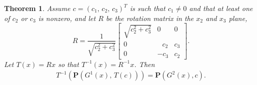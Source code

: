 \documentclass{article}
\newtheorem{theorem}{Theorem}
\def\bP{\mathbf{P}}
\begin{document}
\begin{theorem} \label{thm-cylinder}
Assume $c = (c_1, \, c_2, \, c_3)^T$ is such that $c_1 \neq 0$
and that at least one of $c_2$ or $c_3$ is nonzero, and let $R$ be 
the rotation matrix in the $x_2$ and $x_3$ plane,
\[
R = \frac{1}{\sqrt{c_2^2 + c_3^2}}
    \left[ \begin{array}{ccc}
    \sqrt{c_2^2+c_3^2} & 0 & 0 \\
    0 & \;\;\,c_2 & c_3 \\
    0 & -c_3 & c_2
    \end{array} \right].
\]
Let $T(x) = Rx$ so that $T^{-1}(x) = R^{-1}x$. Then
\begin{eqnarray*}
T^{-1} \left( \bP\left( G^1(x), \, T(c) \right) \right) =
       \bP \left( G^2(x), c \right).
\end{eqnarray*}
\end{theorem}
\end{document}
